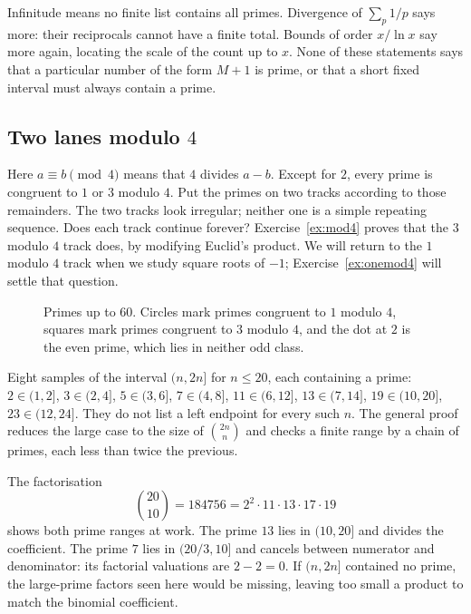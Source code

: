 \begin{reminder}
Infinitude means no finite list contains all primes. Divergence of $\sum_p1/p$ says more: their reciprocals cannot have a finite total. Bounds of order $x/\ln x$ say more again, locating the scale of the count up to $x$. None of these statements says that a particular number of the form $M+1$ is prime, or that a short fixed interval must always contain a prime.
\end{reminder}

\subsection*{Two lanes modulo $4$}
Here $a\equiv b\pmod4$ means that $4$ divides $a-b$. Except for $2$, every prime is congruent to $1$ or $3$ modulo $4$. Put the primes on two tracks according to those remainders. The two tracks look irregular; neither one is a simple repeating sequence. Does each track continue forever? Exercise~\ref{ex:mod4} proves that the $3$ modulo $4$ track does, by modifying Euclid's product. We will return to the $1$ modulo $4$ track when we study square roots of $-1$; Exercise~\ref{ex:onemod4} will settle that question.

\begin{figure}[ht]
\centering
{}
\caption{Primes up to $60$. Circles mark primes congruent to $1$ modulo $4$, squares mark primes congruent to $3$ modulo $4$, and the dot at $2$ is the even prime, which lies in neither odd class.}
\label{fig:mod4-line}
\end{figure}

\begin{examplex}
Eight samples of the interval $(n,2n]$ for $n\le20$, each containing a prime: $2\in(1,2]$, $3\in(2,4]$, $5\in(3,6]$, $7\in(4,8]$, $11\in(6,12]$, $13\in(7,14]$, $19\in(10,20]$, $23\in(12,24]$. They do not list a left endpoint for every such $n$. The general proof reduces the large case to the size of $\binom{2n}{n}$ and checks a finite range by a chain of primes, each less than twice the previous.
\end{examplex}

\begin{examplex}
The factorisation
\[
\binom{20}{10}=184756=2^2\cdot11\cdot13\cdot17\cdot19
\]
shows both prime ranges at work. The prime $13$ lies in $(10,20]$ and divides the coefficient. The prime $7$ lies in $(20/3,10]$ and cancels between numerator and denominator: its factorial valuations are $2-2=0$. If $(n,2n]$ contained no prime, the large-prime factors seen here would be missing, leaving too small a product to match the binomial coefficient.
\end{examplex}

